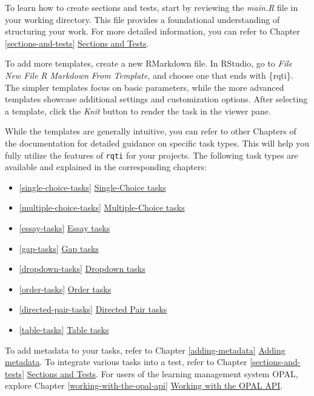 \documentclass[twoside]{tufte-book}
\providecommand{\tightlist}{%
  \setlength{\itemsep}{0pt}\setlength{\parskip}{0pt}}
\begin{document}
To learn how to create sections and tests, start by reviewing the \emph{main.R} file in your working directory. This file provides a foundational understanding of structuring your work. For more detailed information, you can refer to Chapter \ref{sections-and-tests} \href{Chapters/section.html}{Sections and Tests}.

To add more templates, create a new RMarkdown file. In RStudio, go to \emph{File} \textrightarrow{} \emph{New File} \textrightarrow{} \emph{R Markdown} \textrightarrow{} \emph{From Template}, and choose one that ends with \{rqti\}. The simpler templates focus on basic parameters, while the more advanced templates showcase additional settings and customization options. After selecting a template, click the \emph{Knit} button to render the task in the viewer pane.

While the templates are generally intuitive, you can refer to other Chapters of the documentation for detailed guidance on specific task types. This will help you fully utilize the features of \texttt{rqti} for your projects. The following task types are available and explained in the corresponding chapters:

\begin{itemize}
\tightlist
\item
  \ref{single-choice-tasks} \href{Chapters/singlechoice.html}{Single-Choice tasks}
\item
  \ref{multiple-choice-tasks} \href{Chapters/multiplechoice.html}{Multiple-Choice tasks}
\item
  \ref{essay-tasks} \href{Chapters/essay.html}{Essay tasks}
\item
  \ref{gap-tasks} \href{Chapters/gap.html}{Gap tasks}
\item
  \ref{dropdown-tasks} \href{Chapters/dropdown.html}{Dropdown tasks}
\item
  \ref{order-tasks} \href{Chapters/order.html}{Order tasks}
\item
  \ref{directed-pair-tasks} \href{Chapters/directedpairs.html}{Directed Pair tasks}
\item
  \ref{table-tasks} \href{Chapters/table.html}{Table tasks}
\end{itemize}

To add metadata to your tasks, refer to Chapter \ref{adding-metadata} \href{Chapters/adding_metadata.html}{Adding metadata}.
To integrate various tasks into a test, refer to Chapter \ref{sections-and-tests} \href{Chapters/section.html}{Sections and Tests}.
For users of the learning management system OPAL, explore Chapter \ref{working-with-the-opal-api} \href{Chapters/api_opal.html}{Working with the OPAL API}.
\end{document}
